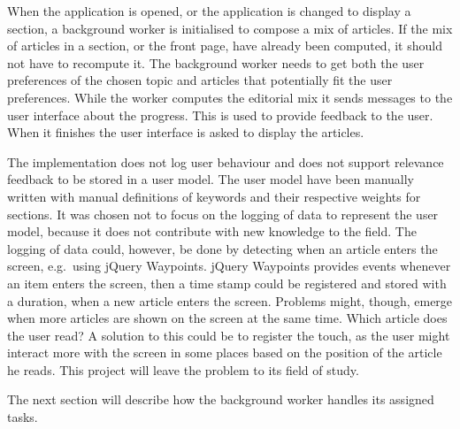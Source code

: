 
When the application is opened, or the application is changed to display a section, a background worker is initialised to compose a mix of articles. If the mix of articles in a section, or the front page, have already been computed, it should not have to recompute it. The background worker needs to get both the user preferences of the chosen topic and articles that potentially fit the user preferences. While the worker computes the editorial mix it sends messages to the user interface about the progress. This is used to provide feedback to the user. When it finishes the user interface is asked to display the articles.

The implementation does not log user behaviour and does not support relevance feedback to be stored in a user model. The user model have been manually written with manual definitions of keywords and their respective weights for sections. It was chosen not to focus on the logging of data to represent the user model, because it does not contribute with new knowledge to the field. The logging of data could, however, be done by detecting when an article enters the screen, e.g.\ using jQuery Waypoints. jQuery Waypoints provides events whenever an item enters the screen, then a time stamp could be registered and stored with a duration, when a new article enters the screen. Problems might, though, emerge when more articles are shown on the screen at the same time. Which article does the user read? A solution to this could be to register the touch, as the user might interact more with the screen in some places based on the position of the article he reads. This project will leave the problem to its field of study.

The next section will describe how the background worker handles its assigned tasks.


